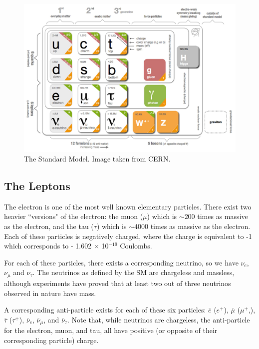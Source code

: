 \begin{figure}[h]
    \centering
        \includegraphics[width=\textwidth]{F1/StandardModelTable}
        \caption{The Standard Model. Image taken from CERN\cite{SMTable}.}
        \label{Fig:Intro:SMTable}
\end{figure}

\clearpage
\subsection{The Leptons}
The electron is one of the most well known elementary particles. There exist two heavier ``versions" of the electron: the muon ($\mu$) which is $\sim 200$ times as massive as the electron, and the tau ($\tau$) which is $\sim 4000$ times as massive as the electron. Each of these particles is negatively charged, where the charge is equivalent to -1 which corresponds to - 1.602 $\times$ 10$^{-19}$ Coulombs.

For each of these particles, there exists a corresponding neutrino, so we have $\nu_e$, $\nu_\mu$ and $\nu_\tau$. The neutrinos as defined by the SM are chargeless and massless, although experiments have proved that at least two out of three neutrinos observed in nature have mass. 

A corresponding anti-particle exists for each of these six particles: $\overline{e}$ ($e^+$), $\overline{\mu}$ ($\mu^+$,), $\overline{\tau}$ ($\tau^+$), $\overline{\nu}_e$, $\overline{\nu}_\mu$, and $\overline{\nu}_\tau$. Note that, while neutrinos are chargeless, the anti-particle for the electron, muon, and tau, all have positive (or opposite of their corresponding particle) charge.

